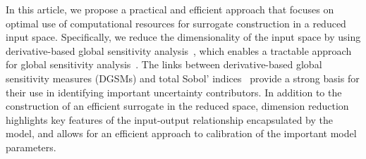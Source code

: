  

In this article, we propose a practical and efficient approach that focuses on
optimal use of computational resources for surrogate construction in a 
reduced input space. Specifically, we reduce the dimensionality of the
input space by using derivative-based global sensitivity
analysis~\cite{Sobol:2009,Sobol:2010,Lamboni:2013,Kucherenko:2009,Kucherenko:2016},
which enables a tractable approach for global sensitivity
analysis~\cite{Kucherenko:2016}. The links between derivative-based
global sensitivity measures (DGSMs) and total Sobol'
indices~\cite{Sobol:2009,Kucherenko:2009,Kucherenko:2016} provide a strong
basis for their use in identifying important uncertainty contributors. 
In addition
to the construction of an efficient surrogate in the reduced space,
dimension reduction highlights key features of the input-output relationship
encapsulated by the model, and allows for an efficient approach to calibration
of the important model parameters. 

%
%


